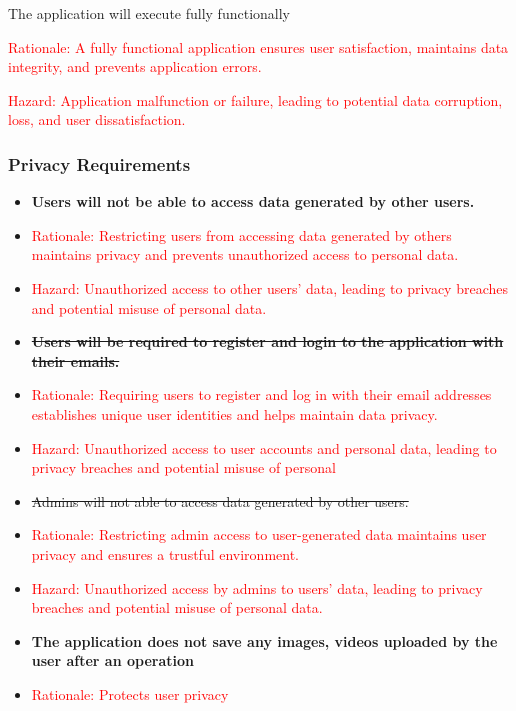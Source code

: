 \documentclass{article}
\newcounter{irreqnum} %
\newcounter{prrreqnum} %
\begin{document}
\begin{itemize}
{    \item[IR\refstepcounter{irreqnum}\theirreqnum
    \label{R_Inputs}:] The application will execute fully functionally}
    \item[] \textcolor{red}{Rationale: A fully functional application ensures user satisfaction, maintains data integrity, and prevents application errors.}
    \item[] \textcolor{red}{Hazard: Application malfunction or failure, leading to potential data corruption, loss, and user dissatisfaction.}
    
\end{itemize}

\subsubsection{Privacy Requirements}
\begin{itemize}
    \item[PRR\refstepcounter{prrreqnum}\theprrreqnum \label{R_Inputs}:] \textbf{Users will not be able to access data generated by other users.}
    \item[] \textcolor{red}{Rationale: Restricting users from accessing data generated by others maintains privacy and prevents unauthorized access to personal data.}
    \item[] \textcolor{red}{Hazard: Unauthorized access to other users' data, leading to privacy breaches and potential misuse of personal data.}
    
    \item[PRR\refstepcounter{prrreqnum}\theprrreqnum \label{R_Inputs}:] \sout{\textbf{Users will be required to register and login to the application with their emails.}}
    \item[] \textcolor{red}{Rationale: Requiring users to register and log in with their email addresses establishes unique user identities and helps maintain data privacy.}
    \item[] \textcolor{red}{Hazard: Unauthorized access to user accounts and personal data, leading to privacy breaches and potential misuse of personal}
    
    \item[PRR\refstepcounter{prrreqnum}\theprrreqnum \label{R_Inputs}:] \sout{Admins will not able to access data generated by other users.}
    \item[] \textcolor{red}{Rationale: Restricting admin access to user-generated data maintains user privacy and ensures a trustful environment.}
    \item[] \textcolor{red}{Hazard: Unauthorized access by admins to users' data, leading to privacy breaches and potential misuse of personal data.}
    
    \item[PRR\refstepcounter{prrreqnum}\theprrreqnum \label{R_Inputs}:] \textbf{The application does not save any images, videos uploaded by the user after an operation}
    \item[] \textcolor{red}{Rationale: Protects user privacy}
  
\end{itemize}
\end{document}
